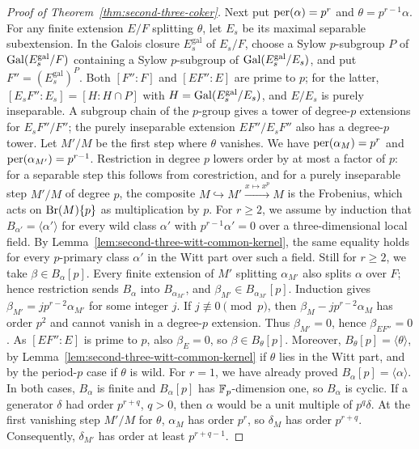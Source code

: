 \begin{proof}[Proof of Theorem~\ref{thm:second-three-coker}]
Next put $\operatorname{per}(\alpha)=p^r$ and $\theta=p^{r-1}\alpha$.
For any finite extension $E/F$ splitting $\theta$, let $E_s$ be its maximal separable subextension.
In the Galois closure $E^{\mathrm{gal}}_s$ of $E_s/F$, choose a Sylow $p$-subgroup $P$ of $\operatorname{Gal}(E^{\mathrm{gal}}_s/F)$ containing a Sylow $p$-subgroup of $\operatorname{Gal}(E^{\mathrm{gal}}_s/E_s)$, and put $F''=(E^{\mathrm{gal}}_s)^P$.
Both $[F'':F]$ and $[EF'':E]$ are prime to $p$; for the latter, $[E_sF'':E_s]=[H:H\cap P]$ with $H=\operatorname{Gal}(E^{\mathrm{gal}}_s/E_s)$, and $E/E_s$ is purely inseparable.
A subgroup chain of the $p$-group gives a tower of degree-$p$ extensions for $E_sF''/F''$; the purely inseparable extension $EF''/E_sF''$ also has a degree-$p$ tower.
Let $M'/M$ be the first step where $\theta$ vanishes.
We have $\operatorname{per}(\alpha_M)=p^r$ and $\operatorname{per}(\alpha_{M'})=p^{r-1}$.
Restriction in degree $p$ lowers order by at most a factor of $p$: for a separable step this follows from corestriction, and for a purely inseparable step $M'/M$ of degree $p$, the composite $M\hookrightarrow M'\xrightarrow{x\mapsto x^p}M$ is the Frobenius, which acts on $\operatorname{Br}(M)\{p\}$ as multiplication by $p$.
For $r\ge2$, we assume by induction that $B_{\alpha'}=\langle\alpha'\rangle$ for every wild class $\alpha'$ with $p^{r-1}\alpha'=0$ over a three-dimensional local field.
By Lemma~\ref{lem:second-three-witt-common-kernel}, the same equality holds for every $p$-primary class $\alpha'$ in the Witt part over such a field.
Still for $r\ge2$, we take $\beta\in B_\alpha[p]$.
Every finite extension of $M'$ splitting $\alpha_{M'}$ also splits $\alpha$ over $F$; hence restriction sends $B_\alpha$ into $B_{\alpha_{M'}}$, and $\beta_{M'}\in B_{\alpha_{M'}}[p]$.
Induction gives $\beta_{M'}=j p^{r-2}\alpha_{M'}$ for some integer $j$.
If $j\not\equiv0\pmod p$, then $\beta_M-jp^{r-2}\alpha_M$ has order $p^2$ and cannot vanish in a degree-$p$ extension.
Thus $\beta_{M'}=0$, hence $\beta_{EF''}=0$.
As $[EF'':E]$ is prime to $p$, also $\beta_E=0$, so $\beta\in B_\theta[p]$.
Moreover, $B_\theta[p]=\langle\theta\rangle$, by Lemma~\ref{lem:second-three-witt-common-kernel} if $\theta$ lies in the Witt part, and by the period-$p$ case if $\theta$ is wild.
For $r=1$, we have already proved $B_\alpha[p]=\langle\alpha\rangle$.
In both cases, $B_\alpha$ is finite and $B_\alpha[p]$ has $\mathbb F_p$-dimension one, so $B_\alpha$ is cyclic.
If a generator $\delta$ had order $p^{r+q}$, $q>0$, then $\alpha$ would be a unit multiple of $p^q\delta$.
At the first vanishing step $M'/M$ for $\theta$, $\alpha_M$ has order $p^r$, so $\delta_M$ has order $p^{r+q}$.
Consequently, $\delta_{M'}$ has order at least $p^{r+q-1}$.

\end{proof}
